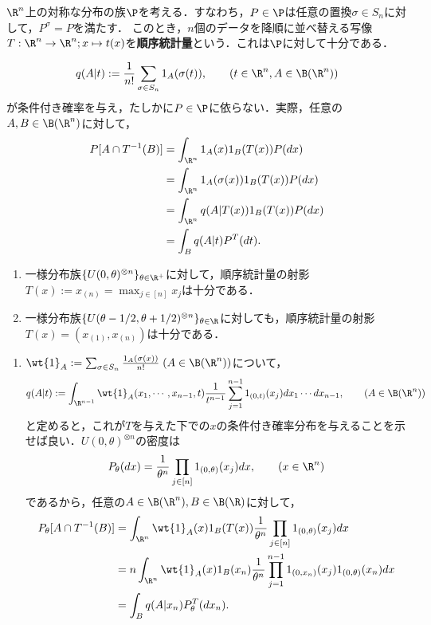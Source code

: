 \documentclass[uplatex,dvipdfmx]{jsreport}
\begin{document}
\begin{example}[対称な分布の族に対して順序統計量は十分]
    $\R^n$上の対称な分布の族$\P$を考える．すなわち，$P\in\P$は任意の置換$\sigma\in S_n$に対して，$P^\sigma=P$を満たす．
    このとき，$n$個のデータを降順に並べ替える写像$T:\R^n\to\R^n;x\mapsto t(x)$を\textbf{順序統計量}という．これは$\P$に対して十分である．
\end{example}
\begin{Proof}
    \[q(A|t):=\frac{1}{n!}\sum_{\sigma\in S_n}1_A(\sigma(t)),\qquad(t\in\R^n,A\in\B(\R^n))\]
    が条件付き確率を与え，たしかに$P\in\P$に依らない．実際，任意の$A,B\in\B(\R^n)$に対して，
    \begin{align*}
        P[A\cap T^{-1}(B)]&=\int_{\R^n}1_A(x)1_B(T(x))P(dx)\\
        &=\int_{\R^n}1_A(\sigma(x))1_B(T(x))P(dx)\\
        &=\int_{\R^n}q(A|T(x))1_B(T(x))P(dx)\\
        &=\int_Bq(A|t)P^T(dt).
    \end{align*}
\end{Proof}

\begin{example}[順序統計量の射影として得る十分統計量]\mbox{}
    \begin{enumerate}
        \item 一様分布族$\{U(0,\theta)^{\otimes n}\}_{\theta\in\R^+}$に対して，順序統計量の射影$T(x):=x_{(n)}=\max_{j\in[n]}x_j$は十分である．
        \item 一様分布族$\{U(\theta-1/2,\theta+1/2)^{\otimes n}\}_{\theta\in\R}$に対しても，順序統計量の射影$T(x)=(x_{(1)},x_{(n)})$は十分である．
    \end{enumerate}
\end{example}
\begin{Proof}\mbox{}
    \begin{enumerate}
        \item $\wt{1}_A:=\sum_{\sigma\in S_n}\frac{1_A(\sigma(x))}{n!}\;(A\in\B(\R^n))$について，
        \[q(A|t):=\int_{\R^{n-1}}\wt{1}_A(x_1,\cdots,x_{n-1},t)\frac{1}{t^{n-1}}\sum_{j=1}^{n-1}1_{(0,t)}(x_j)dx_1\cdots dx_{n-1},\qquad(A\in\B(\R^n))\]
        と定めると，これが$T$を与えた下での$x$の条件付き確率分布を与えることを示せば良い．$U(0,\theta)^{\otimes n}$の密度は
        \[P_\theta(dx)=\frac{1}{\theta^n}\prod_{j\in[n]}1_{(0,\theta)}(x_j)dx,\qquad(x\in\R^n)\]
        であるから，任意の$A\in\B(\R^n),B\in\B(\R)$に対して，
        \begin{align*}
            P_\theta[A\cap T^{-1}(B)]&=\int_{\R^n}\wt{1}_A(x)1_B(T(x))\frac{1}{\theta^n}\prod_{j\in[n]}1_{(0,\theta)}(x_j)dx\\
            &=n\int_{\R^n}\wt{1}_A(x)1_B(x_n)\frac{1}{\theta^n}\prod_{j=1}^{n-1}1_{(0,x_n)}(x_j)1_{(0,\theta)}(x_n)dx\\
            &=\int_Bq(A|x_n)P^T_\theta(dx_n).
        \end{align*}
    \end{enumerate}
\end{Proof}
\end{document}
